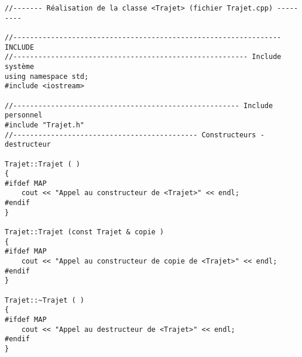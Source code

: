 \begin{verbatim}
//------- Réalisation de la classe <Trajet> (fichier Trajet.cpp) ---------

//---------------------------------------------------------------- INCLUDE
//-------------------------------------------------------- Include système
using namespace std;
#include <iostream>

//------------------------------------------------------ Include personnel
#include "Trajet.h"
//-------------------------------------------- Constructeurs - destructeur

Trajet::Trajet ( )
{
#ifdef MAP
    cout << "Appel au constructeur de <Trajet>" << endl;
#endif
}

Trajet::Trajet (const Trajet & copie )
{
#ifdef MAP
    cout << "Appel au constructeur de copie de <Trajet>" << endl;
#endif
}

Trajet::~Trajet ( )
{
#ifdef MAP
    cout << "Appel au destructeur de <Trajet>" << endl;
#endif
}
\end{verbatim}
